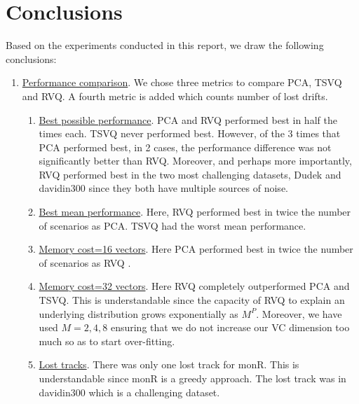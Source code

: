 %






\section{Conclusions}
Based on the experiments conducted in this report, we draw the following conclusions:

\begin{enumerate}
\item \underline{Performance comparison}.  We chose three metrics to compare PCA, TSVQ and RVQ.  A fourth metric is added which counts number of lost drifts.
\begin{enumerate}
\item \underline{Best possible performance}.  PCA and RVQ performed best in half the times each.  TSVQ never performed best.  However, of the 3 times that PCA performed best, in 2 cases, the performance difference was not significantly better than RVQ.  Moreover, and perhaps more importantly, RVQ performed best in the two most challenging datasets, Dudek and davidin300 since they both have multiple sources of noise.
\item \underline{Best mean performance}.  Here, RVQ performed best in twice the number of scenarios as PCA.  TSVQ had the worst mean performance.
\item \underline{Memory cost=16 vectors}.  Here PCA performed best in twice the number of scenarios as RVQ .
\item \underline{Memory cost=32 vectors}.  Here RVQ completely outperformed PCA and TSVQ.  This is understandable since the capacity of RVQ to explain an underlying distribution grows exponentially as $M^P$.  Moreover, we have used $M=2, 4, 8$ ensuring that we do not increase our VC dimension too much so as to start over-fitting.
\item \underline{Lost tracks}.  There was only one lost track for monR.  This is understandable since monR is a greedy approach.  The lost track was in davidin300 which is a challenging dataset.
\end{enumerate}


\end{enumerate}
